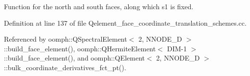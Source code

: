 Function for the north and south faces, along which s1 is fixed. 



Definition at line 137 of file Qelement\+\_\+face\+\_\+coordinate\+\_\+translation\+\_\+schemes.\+cc.



Referenced by oomph\+::\+Q\+Spectral\+Element$<$ 2, N\+N\+O\+D\+E\+\_\+D $>$\+::build\+\_\+face\+\_\+element(), oomph\+::\+Q\+Hermite\+Element$<$ D\+I\+M-\/1 $>$\+::build\+\_\+face\+\_\+element(), and oomph\+::\+Q\+Element$<$ 2, N\+N\+O\+D\+E\+\_\+D $>$\+::bulk\+\_\+coordinate\+\_\+derivatives\+\_\+fct\+\_\+pt().


